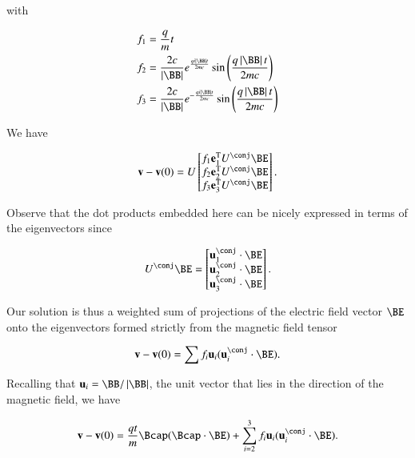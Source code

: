 with

\begin{align}\label{eqn:lorentzRotation:560}
f_1 &= \frac{q}{m} t \\
f_2 &= \frac{2 c }{\Abs{\BB}} e^{ \frac{q i \Abs{\BB} t}{ 2 m c } } \sin \left( \frac{q \Abs{\BB} t}{ 2 m c } \right) \\
f_3 &= \frac{2 c }{\Abs{\BB}} e^{ -\frac{q i \Abs{\BB} t}{ 2 m c } } \sin \left( \frac{q \Abs{\BB} t}{ 2 m c } \right)
\end{align}

We have

\begin{equation}\label{eqn:lorentzRotation:580}
\Bv - \Bv(0) = U
\begin{bmatrix}
f_1 \Be_1^\T U^\conj \BE \\
f_2 \Be_2^\T U^\conj \BE \\
f_3 \Be_3^\T U^\conj \BE \\
\end{bmatrix}.
\end{equation}

Observe that the dot products embedded here can be nicely expressed in terms of the eigenvectors since

\begin{equation}\label{eqn:lorentzRotation:600}
U^\conj \BE
= 
\begin{bmatrix}
\Bu_1^\conj \cdot \BE \\
\Bu_2^\conj \cdot \BE \\
\Bu_3^\conj \cdot \BE
\end{bmatrix}.
\end{equation}

Our solution is thus a weighted sum of projections of the electric field vector $\BE$ onto the eigenvectors formed strictly from the magnetic field tensor

\begin{equation}\label{eqn:lorentzRotation:620}
\Bv - \Bv(0) = \sum f_i \Bu_i ( \Bu_i^\conj \cdot \BE ).
\end{equation}

Recalling that $\Bu_i = \BB/\Abs{\BB}$, the unit vector that lies in the direction of the magnetic field, we have

\begin{equation}\label{eqn:lorentzRotation:640}
\Bv - \Bv(0) = \frac{q t}{m} \Bcap (\Bcap \cdot \BE)
+ \sum_{i=2}^3 f_i \Bu_i ( \Bu_i^\conj \cdot \BE ).
\end{equation}


